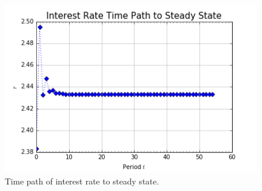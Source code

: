 \documentclass[letterpaper,12pt]{article}
\theoremstyle{definition}
\begin{document}
\begin{figure}[h!]
\centering
\includegraphics[scale=1]{figures/time_path_r}
\caption{Time path of interest rate to steady state.}
\end{figure}
\end{document}
